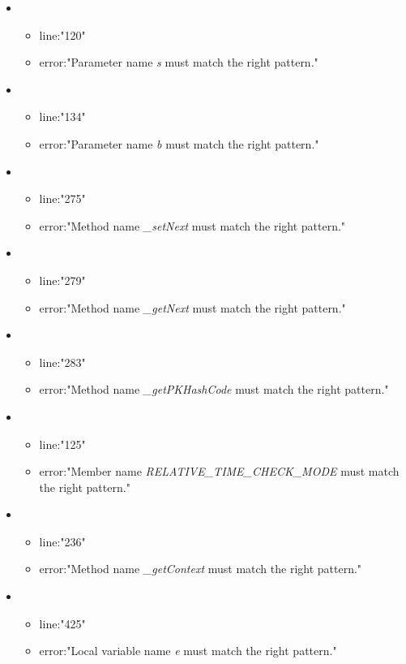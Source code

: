\begin{itemize}
\begin{itemize}
	\end{itemize}
	\item 
	\begin{itemize} 
		\item line:"120" 
		\item error:"Parameter name \emph{s} must match the right pattern." 
	\end{itemize}
	\item 
	\begin{itemize} 
		\item line:"134" 
		\item error:"Parameter name \emph{b} must match the right pattern." 
	\end{itemize}
	\item 
	\begin{itemize} 
		\item line:"275" 
		\item error:"Method name \emph{\_setNext} must match the right pattern." 
	\end{itemize}
	\item 
	\begin{itemize} 
		\item line:"279" 
		\item error:"Method name \emph{\_getNext} must match the right pattern." 
	\end{itemize}
	\item 
	\begin{itemize} 
		\item line:"283" 
		\item error:"Method name \emph{\_getPKHashCode} must match the right pattern." 
	\end{itemize}
	\item 
	\begin{itemize} 
		\item line:"125" 
		\item error:"Member name \emph{RELATIVE\_TIME\_CHECK\_MODE} must match the right pattern." 
	\end{itemize}
	\item 
	\begin{itemize} 
		\item line:"236" 
		\item error:"Method name \emph{\_getContext} must match the right pattern." 
	\end{itemize}
	\item 
	\begin{itemize} 
		\item line:"425" 
		\item error:"Local variable name \emph{e} must match the right pattern." 

\end{itemize}
\end{itemize}
